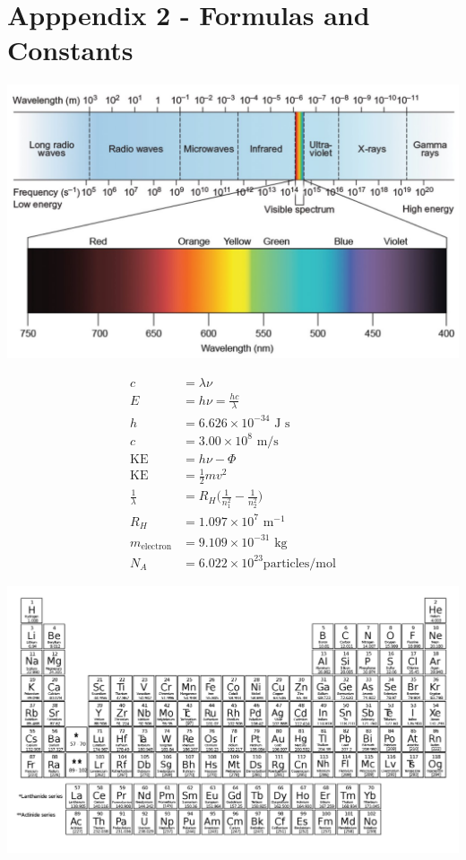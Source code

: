 \documentclass[12pt]{exam}		%
\begin{document}
\appendix

\section{Apppendix 2 - Formulas and Constants}

\begin{center}
  \includegraphics[scale=0.35]{electromag}
\end{center}

\begin{align*}
  c & = \lambda \nu \\
  E & = h\nu = \frac{hc}{\lambda} \\
  h & = 6.626 \times 10^{-34} \text{ J s} \\
  c & = 3.00 \times 10^{8} \text{ m/s} \\
  \text{KE} & = h\nu - \Phi \\
  \text{KE} & = \frac{1}{2} mv^2 \\
  \frac{1}{\lambda} & = R_H \Big(\frac{1}{n_1^2} - \frac{1}{n_2^2}\Big) \\
  R_H & = 1.097 \times 10^7 \text{ m}^{-1} \\
  m_\text{electron} & = 9.109 \times 10^{-31} \text{ kg} \\
  N_A & = 6.022 \times 10^{23} \text{particles/mol}
\end{align*}

\begin{center}
  \includegraphics[scale=0.26,angle=90]{periodic_table}
\end{center}
\end{document}
